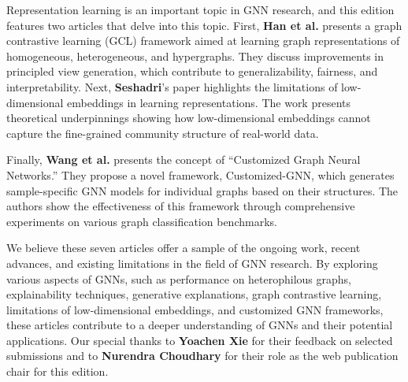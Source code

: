 \documentclass[11pt]{article}
\begin{document}
Representation learning is an important topic in GNN research, and this edition features two articles that delve into this topic. First, {\bf Han et al.} presents a graph contrastive learning (GCL) framework aimed at learning graph representations of homogeneous, heterogeneous, and hypergraphs. They discuss improvements in principled view generation, which contribute to generalizability, fairness, and interpretability. Next, {\bf Seshadri}'s paper highlights the limitations of low-dimensional embeddings in learning representations. The work presents theoretical underpinnings showing how low-dimensional embeddings cannot capture the fine-grained community structure of real-world data.

Finally, {\bf Wang et al.} presents the concept of “Customized Graph Neural Networks.” They propose a novel framework, Customized-GNN, which generates sample-specific GNN models for individual graphs based on their structures. The authors show the effectiveness of this framework through comprehensive experiments on various graph classification benchmarks.

We believe these seven articles offer a sample of the ongoing work, recent advances, and existing limitations in the field of GNN research. By exploring various aspects of GNNs, such as performance on heterophilous graphs, explainability techniques, generative explanations, graph contrastive learning, limitations of low-dimensional embeddings, and customized GNN frameworks, these articles contribute to a deeper understanding of GNNs and their potential applications.  Our special thanks to {\bf Yoachen Xie} for their feedback on selected submissions and to {\bf Nurendra Choudhary} for their role as the web publication chair for this edition. 

\end{document}
